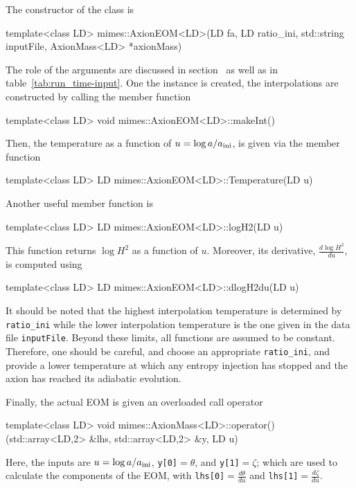 \documentclass[11pt,a4paper]{article}
\begin{document}
The constructor of the class is
%
\begin{cpp}
	template<class LD>
	mimes::AxionEOM<LD>(LD fa, LD ratio_ini, std::string inputFile, AxionMass<LD> *axionMass)
\end{cpp}
%
The role of the arguments are discussed in section~ as well as in table~\ref{tab:run_time-input}. One the instance is created, the interpolations are constructed by calling the member function
%
\begin{cpp}
	template<class LD> void mimes::AxionEOM<LD>::makeInt()
\end{cpp}
%
Then, the temperature as a function of $u=\log a/a_{\rm ini}{}$, is given via the member function 
%
\begin{cpp}
	template<class LD> LD mimes::AxionEOM<LD>::Temperature(LD u)
\end{cpp}
%
Another useful member function is  
%
\begin{cpp}
	template<class LD> LD mimes::AxionEOM<LD>::logH2(LD u)
\end{cpp}
%
This function returns $\log H^2$  as a function of $u$. Moreover, its derivative, $\frac{d \log H^2}{du}$, is computed using 
%
\begin{cpp}
	template<class LD> LD mimes::AxionEOM<LD>::dlogH2du(LD u)
\end{cpp}
%
It should be noted that the highest interpolation temperature is determined by {\tt ratio\_ini} while the lower interpolation temperature is the one given in the data file {\tt inputFile}. Beyond these limits, all functions are assumed to be constant. Therefore, one should be careful, and choose an appropriate {\tt ratio\_ini}, and provide a lower temperature at which any entropy injection has stopped and the axion has reached its adiabatic evolution.


Finally, the actual EOM is given an overloaded call operator
%
\begin{cpp}
	template<class LD> 
	void mimes::AxionMass<LD>::operator()(std::array<LD,2> &lhs, std::array<LD,2> &y, LD u)
\end{cpp}
%
Here, the inputs are $u=\log a/a_{\rm ini}{}$, {\tt y[0]}$=\theta$, and {\tt y[1]}$=\zeta$; which are used to calculate the components of the EOM, with {\tt lhs[0]}$=\frac{d \theta}{d u}$ and {\tt lhs[1]}$=\frac{d \zeta}{d u}$.
\end{document}
